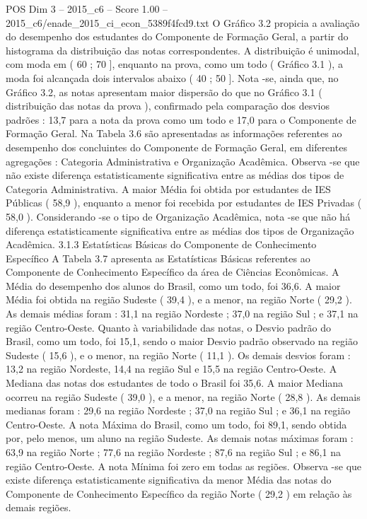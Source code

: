 \begin{textsample}{POS Dim 3 – 2015\_c6 – Score 1.00 – 2015\_c6/enade\_2015\_ci\_econ\_5389f4fcd9.txt}
O Gráfico 3.2 propicia a avaliação do desempenho dos estudantes do Componente de Formação Geral, a partir do histograma da distribuição das notas correspondentes.
A distribuição é unimodal, com moda em ( 60 ; 70 ], enquanto na prova, como um todo ( Gráfico 3.1 ), a moda foi alcançada dois intervalos abaixo ( 40 ; 50 ].
Nota -se, ainda que, no Gráfico 3.2, as notas apresentam maior dispersão do que no Gráfico 3.1 ( distribuição das notas da prova ), confirmado pela comparação dos desvios padrões : 13,7 para a nota da prova como um todo e 17,0 para o Componente de Formação Geral.
Na Tabela 3.6 são apresentadas as informações referentes ao desempenho dos concluintes do Componente de Formação Geral, em diferentes agregações : Categoria Administrativa e Organização Acadêmica.
Observa -se que não existe diferença estatisticamente significativa entre as médias dos tipos de Categoria Administrativa.
A maior Média foi obtida por estudantes de IES Públicas ( 58,9 ), enquanto a menor foi recebida por estudantes de IES Privadas ( 58,0 ).
Considerando -se o tipo de Organização Acadêmica, nota -se que não há diferença estatisticamente significativa entre as médias dos tipos de Organização Acadêmica. 3.1.3 Estatísticas Básicas do Componente de Conhecimento Específico A Tabela 3.7 apresenta as Estatísticas Básicas referentes ao Componente de Conhecimento Específico da área de Ciências Econômicas.
A Média do desempenho dos alunos do Brasil, como um todo, foi 36,6.
A maior Média foi obtida na região Sudeste ( 39,4 ), e a menor, na região Norte ( 29,2 ).
As demais médias foram : 31,1 na região Nordeste ; 37,0 na região Sul ; e 37,1 na região Centro-Oeste.
Quanto à variabilidade das notas, o Desvio padrão do Brasil, como um todo, foi 15,1, sendo o maior Desvio padrão observado na região Sudeste ( 15,6 ), e o menor, na região Norte ( 11,1 ).
Os demais desvios foram : 13,2 na região Nordeste, 14,4 na região Sul e 15,5 na região Centro-Oeste.
A Mediana das notas dos estudantes de todo o Brasil foi 35,6.
A maior Mediana ocorreu na região Sudeste ( 39,0 ), e a menor, na região Norte ( 28,8 ).
As demais medianas foram : 29,6 na região Nordeste ; 37,0 na região Sul ; e 36,1 na região Centro-Oeste.
A nota Máxima do Brasil, como um todo, foi 89,1, sendo obtida por, pelo menos, um aluno na região Sudeste.
As demais notas máximas foram : 63,9 na região Norte ; 77,6 na região Nordeste ; 87,6 na região Sul ; e 86,1 na região Centro-Oeste.
A nota Mínima foi zero em todas as regiões.
Observa -se que existe diferença estatisticamente significativa da menor Média das notas do Componente de Conhecimento Específico da região Norte ( 29,2 ) em relação às demais regiões.

\end{textsample}
